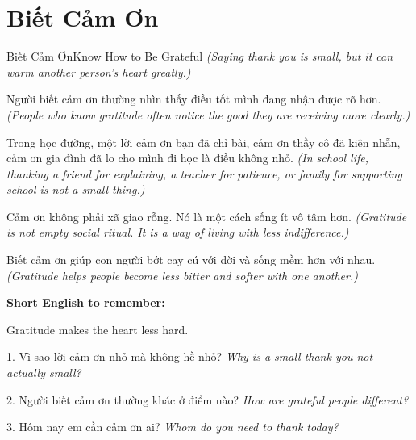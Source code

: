 \section{Biết Cảm Ơn}
\begin{truyen}{Biết Cảm Ơn}{Know How to Be Grateful}
\textit{(Saying thank you is small, but it can warm another person's heart greatly.)}

Người biết cảm ơn thường nhìn thấy điều tốt mình đang nhận được rõ hơn.
\textit{(People who know gratitude often notice the good they are receiving more clearly.)}

Trong học đường, một lời cảm ơn bạn đã chỉ bài, cảm ơn thầy cô đã kiên nhẫn, cảm ơn gia đình đã lo cho mình đi học là điều không nhỏ.
\textit{(In school life, thanking a friend for explaining, a teacher for patience, or family for supporting school is not a small thing.)}

Cảm ơn không phải xã giao rỗng. Nó là một cách sống ít vô tâm hơn.
\textit{(Gratitude is not empty social ritual. It is a way of living with less indifference.)}
\end{truyen}

\begin{baihoc}
Biết cảm ơn giúp con người bớt cay cú với đời và sống mềm hơn với nhau.
\textit{(Gratitude helps people become less bitter and softer with one another.)}
\end{baihoc}

\begin{ghinhoanh}
\textbf{Short English to remember:}

Gratitude makes the heart less hard.

\end{ghinhoanh}

\begin{tuhocnhanh}
1. Vì sao lời cảm ơn nhỏ mà không hề nhỏ? \textit{Why is a small thank you not actually small?}

2. Người biết cảm ơn thường khác ở điểm nào? \textit{How are grateful people different?}

3. Hôm nay em cần cảm ơn ai? \textit{Whom do you need to thank today?}
\end{tuhocnhanh}
\ngancach

